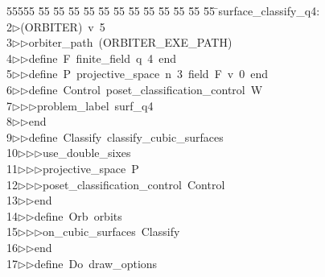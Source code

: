 %
%
\begin{tabbing}
55555 \= 55 \= 55 \= 55 \= 55 \= 55 \= 55 \= 55 \= 55 \= 55 \= 55 \= 55 \= 55 \= \>surface\_classify\_q4:\\[0pt]
2\>$\triangleright$\>(ORBITER)\ v\ 5\ \\[0pt]
3\>$\triangleright$\>$\triangleright$\>orbiter\_path\ (ORBITER\_EXE\_PATH)\ \\[0pt]
4\>$\triangleright$\>$\triangleright$\>define\ F\ finite\_field\ q\ 4\ end\ \\[0pt]
5\>$\triangleright$\>$\triangleright$\>define\ P\ projective\_space\ n\ 3\ field\ F\ v\ 0\ end\ \\[0pt]
6\>$\triangleright$\>$\triangleright$\>define\ Control\ poset\_classification\_control\ W\ \\[0pt]
7\>$\triangleright$\>$\triangleright$\>$\triangleright$\>problem\_label\ surf\_q4\ \\[0pt]
8\>$\triangleright$\>$\triangleright$\>end\ \\[0pt]
9\>$\triangleright$\>$\triangleright$\>define\ Classify\ classify\_cubic\_surfaces\ \\[0pt]
10\>$\triangleright$\>$\triangleright$\>$\triangleright$\>use\_double\_sixes\ \\[0pt]
11\>$\triangleright$\>$\triangleright$\>$\triangleright$\>projective\_space\ P\ \\[0pt]
12\>$\triangleright$\>$\triangleright$\>$\triangleright$\>poset\_classification\_control\ Control\ \\[0pt]
13\>$\triangleright$\>$\triangleright$\>end\ \\[0pt]
14\>$\triangleright$\>$\triangleright$\>define\ Orb\ orbits\ \\[0pt]
15\>$\triangleright$\>$\triangleright$\>$\triangleright$\>on\_cubic\_surfaces\ Classify\ \\[0pt]
16\>$\triangleright$\>$\triangleright$\>end\ \\[0pt]
17\>$\triangleright$\>$\triangleright$\>define\ Do\ draw\_options\ \\[0pt]

\end{tabbing}
